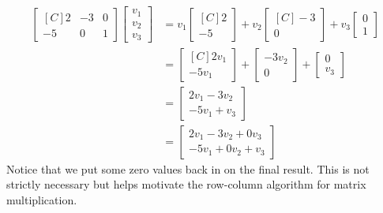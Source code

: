 \begin{example}
\begin{align*}
\begin{bmatrix*}[C]
2 & -3 & 0 \\
-5 & 0 & 1 
\end{bmatrix*}
\begin{bmatrix}v_1\\ v_2 \\ v_3 \end{bmatrix}
&=v_1\begin{bmatrix*}[C]2\\-5 \end{bmatrix*}
+v_2\begin{bmatrix*}[C]-3 \\0\end{bmatrix*}
+v_3\begin{bmatrix}0\\1\end{bmatrix}\\
&=\begin{bmatrix*}[C]2v_1\\-5v_1\end{bmatrix*}
+\begin{bmatrix}-3v_2\\ 0\end{bmatrix} 
+\begin{bmatrix}0\\v_3\end{bmatrix}\\
&=\begin{bmatrix}2v_1-3v_2\\-5v_1+v_3\end{bmatrix}\\
&=\begin{bmatrix}2v_1-3v_2+0v_3\\-5v_1+0v_2+v_3\end{bmatrix}
\end{align*}
Notice that we put some zero values back in on the final result. This is not 
strictly necessary but helps motivate the row-column algorithm for matrix 
multiplication.
\end{example}

